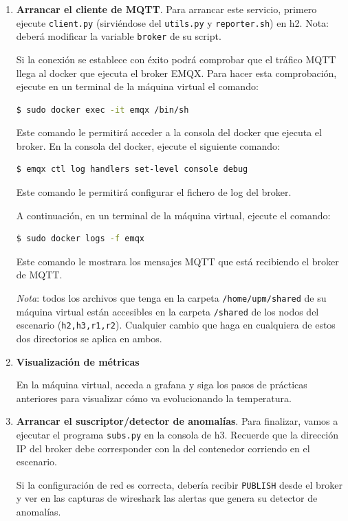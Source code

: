 \documentclass{upmassignment} \usepackage[spanish]{babel} \usepackage{ifthen} \usepackage{amsmath} \usepackage{amsfonts} \usepackage{booktabs}
\begin{document}
\begin{enumerate}[label=\textbf{Actividad {{\arabic*}}}]
\item \textbf{Arrancar el cliente de MQTT}. Para arrancar este servicio, primero ejecute \texttt{client.py} (sirviéndose del \texttt{utils.py} y
        \texttt{reporter.sh}) en h2. Nota: deberá modificar la variable \texttt{broker} de su script. 

Si la conexión se establece con éxito podrá comprobar que el tráfico MQTT llega al docker que ejecuta el broker EMQX. Para hacer esta comprobación, ejecute en un terminal de la máquina virtual el comando:

\begin{lstlisting}[language=bash]
$ sudo docker exec -it emqx /bin/sh
\end{lstlisting}

Este comando le permitirá acceder a la consola del docker que ejecuta el broker. En la consola del docker, ejecute el siguiente comando: 

\begin{lstlisting}[language=bash]
$ emqx ctl log handlers set-level console debug
\end{lstlisting}

Este comando le permitirá configurar el fichero de log del broker. 

A continuación, en un terminal de la máquina virtual, ejecute el comando:

\begin{lstlisting}[language=bash]
$ sudo docker logs -f emqx
\end{lstlisting}

Este comando le mostrara los mensajes MQTT que está recibiendo el broker de MQTT.

\emph{Nota}: todos los archivos que tenga en la carpeta
\texttt{/home/upm/shared} de su máquina virtual están accesibles en la carpeta
\texttt{/shared} de los nodos del escenario (\texttt{h2,h3,r1,r2}). Cualquier cambio que haga en cualquiera de estos dos directorios se aplica en ambos. 

\item \textbf{Visualización de métricas}

En la máquina virtual, acceda a grafana y siga los pasos de prácticas anteriores
para visualizar cómo va evolucionando
la temperatura.



\item \textbf{Arrancar el suscriptor/detector de anomalías}. Para finalizar, vamos a ejecutar el programa \texttt{subs.py} en la consola de h3. Recuerde que la dirección IP del broker debe corresponder con la del contenedor corriendo en el escenario. 

Si la configuración de red es correcta, debería recibir \texttt{PUBLISH}
desde el broker y ver en las capturas de wireshark las alertas que genera su detector de anomalías.

\end{enumerate}
\end{document}
